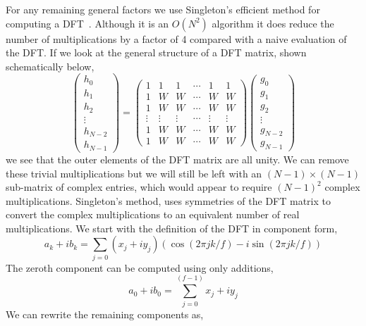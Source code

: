 \documentclass[fleqn,12pt]{article}
\begin{document}
For any remaining general factors we use Singleton's efficient method
for computing a DFT~\cite{singleton}. Although it is an $O(N^2)$
algorithm it does reduce the number of multiplications by a factor of
4 compared with a naive evaluation of the DFT. If we look at the
general structure of a DFT matrix, shown schematically below,
%
\begin{equation}
\left(
\begin{array}{c}
h_0 \\
h_1 \\
h_2 \\
\vdots \\
h_{N-2} \\
h_{N-1}
\end{array}
\right)
=
\left(
\begin{array}{cccccc}
1 & 1 & 1 & \cdots & 1 & 1 \\
1 & W & W & \cdots & W & W \\
1 & W & W & \cdots & W & W \\
\vdots & \vdots & \vdots & \cdots & \vdots & \vdots \\
1 & W & W & \cdots & W & W \\
1 & W & W & \cdots & W & W 
\end{array}
\right)
\left(
\begin{array}{c}
g_0 \\
g_1 \\
g_2 \\
\vdots \\
g_{N-2} \\
g_{N-1}
\end{array}
\right)
\end{equation}
%
we see that the outer elements of the DFT matrix are all unity. We can
remove these trivial multiplications but we will still be left with an
$(N-1) \times (N-1)$ sub-matrix of complex entries, which would appear
to require $(N-1)^2$ complex multiplications.  Singleton's method,
uses symmetries of the DFT matrix to convert the complex
multiplications to an equivalent number of real multiplications. We
start with the definition of the DFT in component form,
%
\begin{equation}
a_k + i b_k = \sum_{j=0} (x_j+iy_j)(\cos(2\pi jk/f) - i\sin(2\pi jk/f))
\end{equation}
%
The zeroth component can be computed using only additions,
%
\begin{equation}
a_0 + i b_0 = \sum_{j=0}^{(f-1)} x_j + i y_j
\end{equation}
%
We can rewrite the remaining components as,
\end{document}
